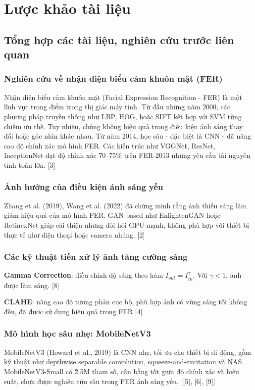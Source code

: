 \section{Lược khảo tài liệu} %
\subsection{Tổng hợp các tài liệu, nghiên cứu trước liên quan}

\subsubsection{Nghiên cứu về nhận diện biểu cảm khuôn mặt (FER)}
Nhận diện biểu cảm khuôn mặt (Facial Expression Recognition - FER) là một lĩnh vực trọng điểm trong thị giác máy tính. Từ đầu những năm 2000, các phương pháp truyền thống như LBP, HOG, hoặc SIFT kết hợp với SVM từng chiếm ưu thế. Tuy nhiên, chúng không hiệu quả trong điều kiện ánh sáng thay đổi hoặc góc nhìn khác nhau. Từ năm 2014, học sâu - đặc biệt là CNN - đã nâng cao độ chính xác mô hình FER. Các kiến trúc như VGGNet, ResNet, InceptionNet đạt độ chính xác 70--75\% trên FER-2013 nhưng yêu cầu tài nguyên tính toán lớn. [3]

\subsubsection{Ảnh hưởng của điều kiện ánh sáng yếu}
Zhang et al. (2019), Wang et al. (2022) đã chứng minh rằng ảnh thiếu sáng làm giảm hiệu quả của mô hình FER. GAN-based như EnlightenGAN hoặc RetinexNet giúp cải thiện nhưng đòi hỏi GPU mạnh, không phù hợp với thiết bị thực tế như điện thoại hoặc camera nhúng. [2]

\subsubsection{Các kỹ thuật tiền xử lý ảnh tăng cường sáng}
\textbf{Gamma Correction}: điều chỉnh độ sáng theo hàm \(I_{out} = I_{in}^\gamma\). Với \(\gamma < 1\), ảnh được làm sáng. [8]\par
\textbf{CLAHE}: nâng cao độ tương phản cục bộ, phù hợp ảnh có vùng sáng tối không đều, đã được sử dụng hiệu quả trong FER [4]

\subsubsection{Mô hình học sâu nhẹ: MobileNetV3}
MobileNetV3 (Howard et al., 2019) là CNN nhẹ, tối ưu cho thiết bị di động, gồm kỹ thuật như depthwise separable convolution, squeeze-and-excitation và NAS. MobileNetV3-Small có \~2.5M tham số, cân bằng tốt giữa độ chính xác và hiệu suất, chưa được nghiên cứu sâu trong FER ánh sáng yếu. [[5], [6], [9]]

